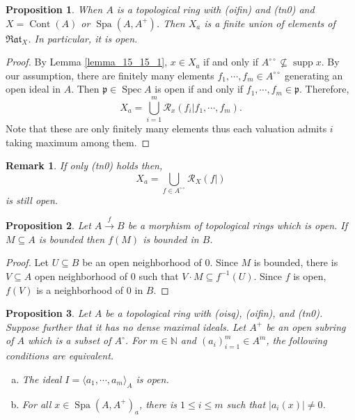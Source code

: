 \documentclass[8pt]{article}
\numberwithin{equation}{section}
\newtheorem{proposition}{Proposition}[subsection]
\newtheorem{remark}{Remark}[subsection]
\DeclareMathOperator{\supp}{supp}
\DeclareMathOperator{\Spec}{Spec}
\DeclareMathOperator{\Spa}{Spa}
\DeclareMathOperator{\Cont}{Cont}
\newcommand{\N}[0]{\mathbb{N}}
\newcommand{\cR}[0]{\mathcal{R}}
\newcommand{\p}[0]{\mathfrak{p}}
\newcommand{\ab}[1]{\vert #1 \vert}
\newcommand{\dcirc}[0]{{\circ\circ}}
\newcommand{\Rat}[0]{\mathfrak{Rat}}
\begin{document}
\begin{proposition}
    \label{fact_15_15}
    When $A$ is a topological ring with (oifin) and (tn0) and $X=\Cont(A)$ or $\Spa(A,A^+)$. Then $X_a$ is a finite union of elements of $\Rat_X$. In particular, it is open.
\end{proposition}
\begin{proof}
    By Lemma \ref{lemma_15_15_1}, $x\in X_a$ if and only if $A^\dcirc\not\subseteq \supp x$. By our assumption, there are finitely many elements $f_1,\cdots,f_m\in A^\dcirc$ generating an open ideal in $A$. Then $\p\in\Spec A$ is open if and only if $f_1,\cdots,f_m\in\p$. Therefore,
    \begin{equation*}
        X_a = \bigcup_{i=1}^m\cR_x(f_i|f_1,\cdots,f_m).
    \end{equation*}
    Note that these are only finitely many elements thus each valuation admits $i$ taking maximum among them.
\end{proof}

\begin{remark}
    If only (tn0) holds then,
    \begin{equation*}
        X_a = \bigcup_{f\in A^\dcirc}\cR_X(f|)
    \end{equation*}
    is still open.
\end{remark}

\begin{proposition}
    \label{fact_15_16}
    Let $A\stackrel{f}{\to} B$ be a morphism of topological rings which is open. If $M\subseteq A$ is bounded then $f(M)$ is bounded in $B$.
\end{proposition}

\begin{proof}
    Let $U\subseteq B$ be an open neighborhood of $0$. Since $M$ is bounded, there is $V\subseteq A$ open neighborhood of $0$ such that $V\cdot M\subseteq f^{-1}(U)$. Since $f$ is open, $f(V)$ is a neighborhood of $0$ in $B$.
\end{proof}

\begin{proposition}
    \label{proposition_15_6}
    Let $A$ be a topological ring with (oisq), (oifin), and (tn0). Suppose further that it has no dense maximal ideals. 
    Let $A^+$ be an open subring of $A$ which is a subset of $A^\circ$. For $m\in\N$ and $(a_i)_{i=1}^m\in A^m$, the following conditions are equivalent.
    \begin{enumerate}[a.]
        \item The ideal $I=\langle a_1,\cdots,a_m\rangle_A$ is open.
        \item For all $x\in\Spa(A,A^+)_a$, there is $1\leq i\leq m$ such that $\ab{a_i(x)}\not=0$.
    \end{enumerate}
\end{proposition}
\end{document}
